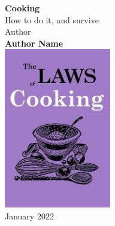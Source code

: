\documentclass[
	12pt,
	a4paper,
	titlepage,
	oneside]{book}
\begin{document}
%
%
\frontmatter
\begin{titlepage}
\begin{center}
  \vspace*{4cm}
  \Huge{\textbf{Cooking}} \\[15pt]
  \LARGE{How to do it, and survive} \\
  \vspace{1.5cm}
  \large{Author}\\[5pt]
  \Large{\textbf{Author Name}} \\
  \vfill
  \includegraphics[width=0.35\textwidth]{Bilder/title.jpg}\\[5pt]
  \vspace{1cm}
  {January 2022}
\end{center}
\end{titlepage}

\newpage

\tableofcontents
%
%
\mainmatter

\end{document}
